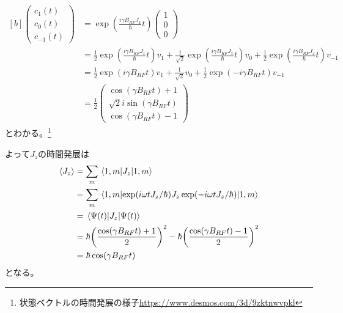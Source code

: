 \documentclass[../ap_2012.tex]{subfiles}
\begin{document}
\begin{equation}\begin{aligned}[b]
    \begin{pmatrix}
        {c_1(t)}\\
        {c_0(t)}\\
        {c_{-1}(t)}
    \end{pmatrix}
    &=\exp(\frac{i\gamma B_{RF}J_x}{\hbar}t)
    \begin{pmatrix}
        1\\
        0\\
        0
    \end{pmatrix}\\
    &=\frac{1}{2}\exp(\frac{i\gamma B_{RF}J_x}{\hbar}t)v_1
    +\frac{1}{\sqrt{2}}\exp(\frac{i\gamma B_{RF}J_x}{\hbar}t)v_0
    +\frac{1}{2}\exp(\frac{i\gamma B_{RF}J_x}{\hbar}t)v_{-1}\\
    &=\frac{1}{2}\exp(i\gamma B_{RF}t)v_1
    +\frac{1}{\sqrt{2}}v_0
    +\frac{1}{2}\exp(-i\gamma B_{RF}t)v_{-1}\\
    &=\frac{1}{2}\begin{pmatrix}
        \cos(\gamma B_{RF}t)+1\\
        \sqrt{2}i\sin(\gamma B_{RF}t)\\
        \cos(\gamma B_{RF}t)-1
    \end{pmatrix}
\end{aligned}\end{equation}
とわかる。\footnote{状態ベクトルの時間発展の様子\url{https://www.desmos.com/3d/9zktnwvpkl}}

よって\(J_z\)の時間発展は
\begin{equation}\begin{aligned}[b]
    \ev{J_z} &= \sum_m \mel{1,m}{J_z}{1,m}\\
    &=\sum_m \mel{1,m}{\exp(i\omega t J_z/\hbar)J_z\exp(-i\omega t J_z/\hbar)}{1,m}\\
    &= \mel{\Psi(t)}{J_z}{\Psi(t)}\\
    &=\hbar\qty(\frac{\cos(\gamma B_{RF}t)+1}{2})^2-\hbar\qty(\frac{\cos(\gamma B_{RF}t)-1}{2})^2\\
    &=\hbar\cos(\gamma B_{RF}t)
\end{aligned}\end{equation}
となる。
\end{document}
